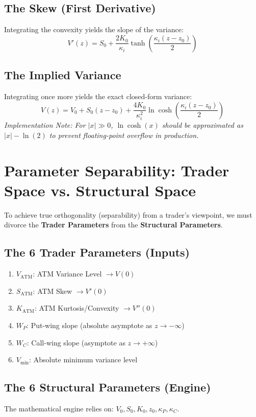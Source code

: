 \documentclass[11pt, a4paper]{article}
\begin{document}
\subsection{The Skew (First Derivative)}
Integrating the convexity yields the slope of the variance:
\begin{equation}
V'(z) = S_0 + \frac{2K_0}{\kappa_i} \tanh\left(\frac{\kappa_i (z - z_0)}{2}\right)
\end{equation}

\subsection{The Implied Variance}
Integrating once more yields the exact closed-form variance:
\begin{equation}
V(z) = V_0 + S_0(z - z_0) + \frac{4K_0}{\kappa_i^2} \ln \cosh \left(\frac{\kappa_i (z - z_0)}{2}\right)
\end{equation}
\textit{Implementation Note: For $|x| \gg 0$, $\ln \cosh(x)$ should be approximated as $|x| - \ln(2)$ to prevent floating-point overflow in production.}

\section{Parameter Separability: Trader Space vs. Structural Space}
To achieve true orthogonality (separability) from a trader's viewpoint, we must divorce the \textbf{Trader Parameters} from the \textbf{Structural Parameters}.

\subsection{The 6 Trader Parameters (Inputs)}
\begin{enumerate}
    \item $V_{\text{ATM}}$: ATM Variance Level $\to V(0)$
    \item $S_{\text{ATM}}$: ATM Skew $\to V'(0)$
    \item $K_{\text{ATM}}$: ATM Kurtosis/Convexity $\to V''(0)$
    \item $W_P$: Put-wing slope (absolute asymptote as $z \to -\infty$)
    \item $W_C$: Call-wing slope (asymptote as $z \to +\infty$)
    \item $V_{\text{min}}$: Absolute minimum variance level
\end{enumerate}

\subsection{The 6 Structural Parameters (Engine)}
The mathematical engine relies on: $V_0, S_0, K_0, z_0, \kappa_P, \kappa_C$.
\end{document}
